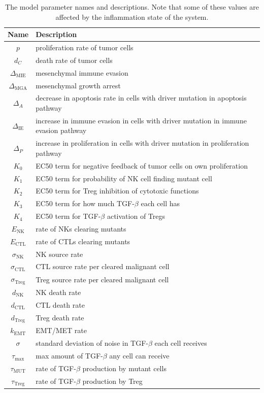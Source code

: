 \documentclass[11pt]{article}
\begin{document}
\begin{table}
\begin{center}
 \begin{tabular}{|| c | l ||} 
 \hline
 {\bf Name} & {\bf Description}  \\ [0.5ex] 
 \hline
 $p$ & proliferation rate of tumor cells \\ 
 \hline
 $d_C$  & death rate of tumor cells \\
 \hline
$\Delta_\text{MIE}$ &  mesenchymal immune evasion \\
 \hline
 $\Delta_\text{MGA}$ & mesenchymal growth arrest    \\
 \hline
  $\Delta_A$ & decrease in apoptosis rate in cells with driver mutation in apoptosis pathway \\ 
    \hline
  $\Delta_\text{IE}$ & increase in immune evasion in cells with driver mutation in immune evasion pathway \\
  \hline
  $\Delta_P$ & increase in proliferation in cells with driver mutation in proliferation pathway\\
  \hline
 $K_0$ & EC50 term for negative feedback of tumor cells on own proliferation\\
 \hline
 $K_1$ & EC50 term for probability of NK cell finding mutant cell\\
 \hline
  $K_2$ & EC50 term for Treg inhibition of cytotoxic functions  \\
  \hline
  $K_3$ & EC50 term for how much TGF-$\beta$ each cell has \\
  \hline
  $K_4$ & EC50 term for TGF-$\beta$ activation of Tregs \\
  \hline
 $E_\text{NK}$ & rate of NKs clearing mutants  \\
  \hline
  $E_\text{CTL}$ & rate of CTLs clearing mutants \\
  \hline
  $\sigma_\text{NK}$ & NK source rate \\ 
  \hline
  $\sigma_\text{CTL}$ & CTL source rate per cleared malignant cell \\ 
  \hline
  $\sigma_\text{Treg}$ & Treg source rate per cleared malignant cell \\ 
  \hline
  $d_\text{NK}$ & NK death rate \\ 
  \hline
  $d_\text{CTL}$ & CTL death rate \\ 
  \hline
  $d_\text{Treg}$ & Treg death rate \\ 
  \hline
  $k_\text{EMT}$ & EMT/MET rate  \\
  \hline
  $\sigma$ & standard deviation of noise in TGF-$\beta$ each cell receives  \\
  \hline
 $\tau_\text{max}$ & max amount of TGF-$\beta$ any cell can receive \\
  \hline 
 $\tau_\text{MUT}$ & rate of TGF-$\beta$ production by mutant cells\\
  \hline
 $\tau_\text{Treg}$ & rate of TGF-$\beta$ production by Treg\\
  \hline
\end{tabular}
  \caption{The model parameter names and descriptions. Note that some of these values are affected by the inflammation state of the system.}
\end{center}
\end{table}
\end{document}
